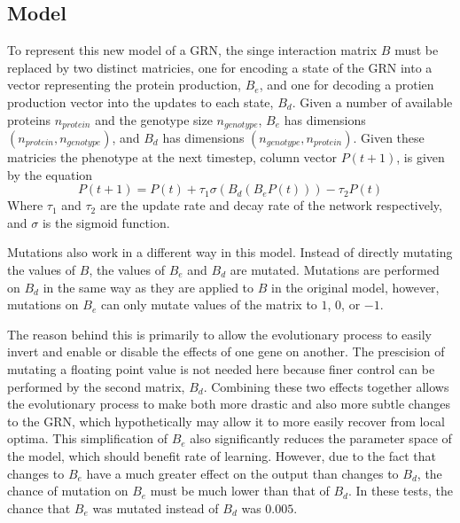 \documentclass[twocolumn,a4paper]{article}
\begin{document}
    \subsection{Model}
    To represent this new model of a GRN, the singe interaction matrix $B$ must be replaced by two distinct matricies, one for encoding a state of the GRN into a vector representing the protein production, $B_e$, and one for decoding a protien production vector into the updates to each state, $B_d$. Given a number of available proteins $n_{protein}$ and the genotype size $n_{genotype}$, $B_e$ has dimensions $(n_{protein},n_{genotype})$, and $B_d$ has dimensions $(n_{genotype},n_{protein})$. Given these matricies the phenotype at the next timestep, column vector $P(t+1)$, is given by the equation
    \begin{equation}
        P(t+1) = P(t) + \tau_1 \sigma (B_d (B_e P(t))) - \tau_2 P(t)
    \end{equation}
    Where $\tau_1$ and $\tau_2$ are the update rate and decay rate of the network respectively, and $\sigma$ is the sigmoid function.

    Mutations also work in a different way in this model. Instead of directly mutating the values of $B$, the values of $B_e$ and $B_d$ are mutated. Mutations are performed on $B_d$ in the same way as they are applied to $B$ in the original model, however, mutations on $B_e$ can only mutate values of the matrix to $1$, $0$, or $-1$.
    
    The reason behind this is primarily to allow the evolutionary process to easily invert and enable or disable the effects of one gene on another. The prescision of mutating a floating point value is not needed here because finer control can be performed by the second matrix, $B_d$. Combining these two effects together allows the evolutionary process to make both more drastic and also more subtle changes to the GRN, which hypothetically may allow it to more easily recover from local optima. This simplification of $B_e$ also significantly reduces the parameter space of the model, which should benefit rate of learning. However, due to the fact that changes to $B_e$ have a much greater effect on the output than changes to $B_d$, the chance of mutation on $B_e$ must be much lower than that of $B_d$. In these tests, the chance that $B_e$ was mutated instead of $B_d$ was $0.005$.
\end{document}
